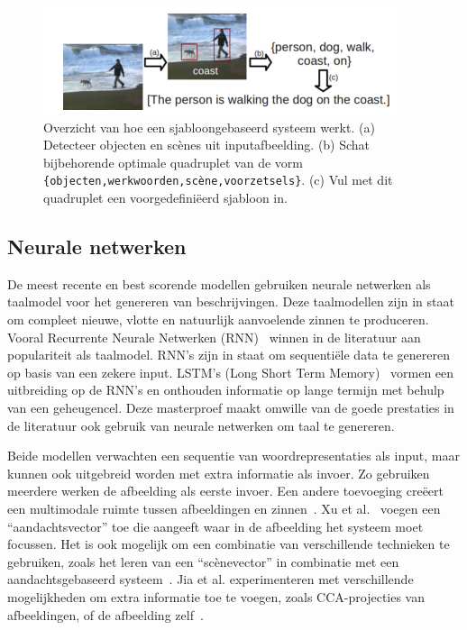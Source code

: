  \begin{figure}[tb]
 	\centering
 	\includegraphics[width=\textwidth]{Images/sjabloon.PNG}
 	\caption[Overzicht van hoe een sjabloongebaseerd systeem werkt]{Overzicht van hoe een sjabloongebaseerd systeem werkt. (a) Detecteer objecten en sc\`enes uit inputafbeelding. (b) Schat bijbehorende optimale quadruplet van de vorm \texttt{\{objecten,werkwoorden,sc\`ene,voorzetsels\}}. (c) Vul met dit quadruplet een voorgedefini\"eerd sjabloon in.~\cite{Yang2011}}
 	\label{fig:sjabloon}
 \end{figure}

\subsection{Neurale netwerken}
De meest recente en best scorende modellen gebruiken neurale netwerken als taalmodel voor het genereren van beschrijvingen. Deze taalmodellen zijn in staat om compleet nieuwe, vlotte en natuurlijk aanvoelende zinnen te produceren. Vooral Recurrente Neurale Netwerken (RNN)~\cite{Mikolov2010} winnen in de literatuur aan populariteit als taalmodel. RNN's zijn in staat om sequenti\"ele data te genereren op basis van een zekere input. LSTM's (Long Short Term Memory)~\cite{SeppHochreiter1997} vormen een uitbreiding op de RNN's en onthouden informatie op lange termijn met behulp van een geheugencel. Deze masterproef maakt omwille van de goede prestaties in de literatuur ook gebruik van neurale netwerken om taal te genereren.

Beide modellen verwachten een sequentie van woordrepresentaties als input, maar kunnen ook uitgebreid worden met extra informatie als invoer. Zo gebruiken meerdere werken de afbeelding als eerste invoer. Een andere toevoeging cre\"eert een multimodale ruimte tussen afbeeldingen en zinnen~\cite{Kiros2014,Socher2014}. Xu et al.~\cite{Xu2015} voegen een ``aandachtsvector'' toe die aangeeft waar in de afbeelding het systeem moet focussen. Het is ook mogelijk om een combinatie van verschillende technieken te gebruiken, zoals het leren van een ``sc\`enevector'' in combinatie met een aandachtsgebaseerd systeem~\cite{Jin2015}. Jia et al. experimenteren met verschillende mogelijkheden om extra informatie toe te voegen, zoals CCA-projecties van afbeeldingen, of de afbeelding zelf~\cite{Fernando2015}.

